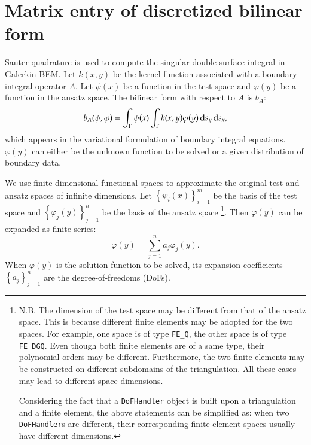 \documentclass[11pt, a4paper]{book}
\begin{document}
\section{Matrix entry of discretized bilinear form}

Sauter quadrature is used to compute the singular double surface integral in Galerkin BEM.
Let $k(x,y)$ be the kernel function associated with a boundary integral operator $A$. Let
$\psi(x)$ be a function in the test space and $\varphi(y)$ be a function in the ansatz
space. The bilinear form with respect to $A$ is $b_A$:
\begin{equation}
  \label{eq:bem-bilinear-form-general}
  b_A(\psi, \varphi) = \int_{\Gamma}\psi(x)\int_{\Gamma}k(x,y)\varphi(y) \,\mathrm{d} s_y \,\mathrm{d} s_x,
\end{equation}
which appears in the variational formulation of boundary integral equations. $\varphi(y)$
can either be the unknown function to be solved or a given distribution of boundary data.

We use finite dimensional functional spaces to approximate the original test and ansatz
spaces of infinite dimensions. Let $\left\{ \psi_i(x) \right\}_{i=1}^m$ be the basis of
the test space and $\left\{ \varphi_j(y) \right\}_{j=1}^n$ be the basis of the ansatz
space \footnote{N.B. The dimension of the test space may be different from that of the ansatz
  space. This is because different finite elements may be adopted for the two spaces. For
  example, one space is of type \texttt{FE\_Q}, the other space is of type
  \texttt{FE\_DGQ}. Even though both finite elements are of a same type, their polynomial
  orders may be different. Furthermore, the two finite elements may be constructed on
  different subdomains of the triangulation. All these cases may lead to different space
  dimensions.

  Considering the fact that a \texttt{DoFHandler} object is built upon a triangulation and
  a finite element, the above statements can be simplified as: when two
  \texttt{DoFHandler}s are different, their corresponding finite element spaces usually
  have different dimensions.}. Then $\varphi(y)$ can be expanded as finite series:
\begin{equation}
  \varphi(y) = \sum_{j=1}^n a_j\varphi_j(y).
\end{equation}
When $\varphi(y)$ is the solution function to be solved, its expansion coefficients
$\left\{ a_j \right\}_{j=1}^n$ are the degree-of-freedoms (DoFs).
\end{document}
